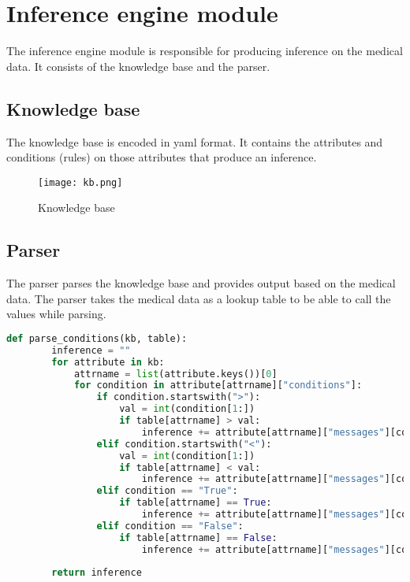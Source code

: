 \section{Inference engine module}
The inference engine module is responsible for producing inference on the medical data. It consists of the knowledge base and the parser.

\subsection{Knowledge base}
The knowledge base is encoded in yaml format. It contains the attributes and conditions (rules) on those attributes that produce an inference.

\begin{figure}[htb]
	\centering
	\texttt{[image: kb.png]}
	\caption{Knowledge base}
	\label{fig:kb}
\end{figure}

\subsection{Parser}
The parser parses the knowledge base and provides output based on the medical data. The parser takes the medical data as a lookup table to be able to call the values while parsing.

\begin{lstlisting}[language=Python, caption={Knowledge base parser}, numbers=none]
	def parse_conditions(kb, table):
		inference = ""
		for attribute in kb:
			attrname = list(attribute.keys())[0]
			for condition in attribute[attrname]["conditions"]:
				if condition.startswith(">"):
					val = int(condition[1:])
					if table[attrname] > val:
						inference += attribute[attrname]["messages"][condition] + " "
				elif condition.startswith("<"):
					val = int(condition[1:])
					if table[attrname] < val:
						inference += attribute[attrname]["messages"][condition] + " "
				elif condition == "True":
					if table[attrname] == True:
						inference += attribute[attrname]["messages"][condition] + " "
				elif condition == "False":
					if table[attrname] == False:
						inference += attribute[attrname]["messages"][condition] + " "
		
		return inference
	
\end{lstlisting}